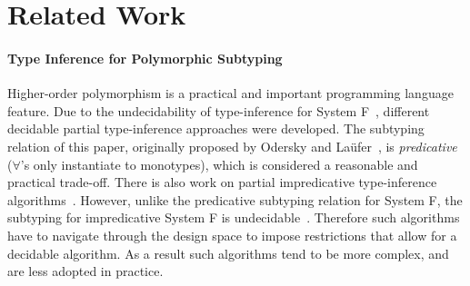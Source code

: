 \section{Related Work}

\paragraph{Type Inference for Polymorphic Subtyping}

Higher-order polymorphism is a practical and important programming language
feature. Due to the undecidability of type-inference for System F~\cite{wells1999typability},
different decidable partial type-inference approaches were developed. The subtyping
relation of this paper, originally proposed by Odersky and
La\"ufer~\cite{odersky1996putting}, is \emph{predicative} ($\forall$'s only
instantiate to monotypes), which is considered a reasonable and practical
trade-off. There is also work on partial impredicative type-inference
algorithms~\cite{le2003ml,leijen2008hmf,vytiniotis2008fph}.
However, unlike the predicative subtyping relation for System F, 
the subtyping for impredicative System F is
undecidable~\cite{tiuryn1996subtyping}. Therefore such algorithms 
have to navigate through the design space to impose restrictions that
allow for a decidable algorithm. As a result such algorithms tend to
be more complex, and are less adopted in practice.

